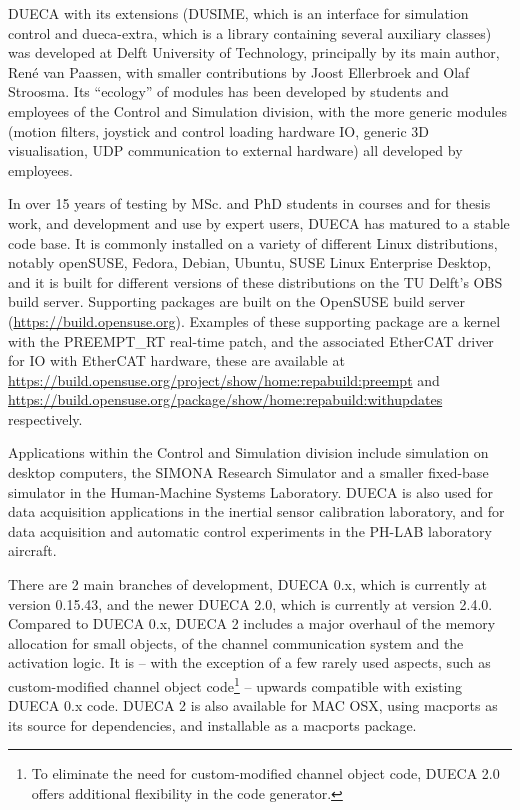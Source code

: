 \documentclass[11pt,a4paper,twoside]{scrreprt}
\begin{document}
DUECA with its extensions (DUSIME, which is an interface for simulation control and dueca-extra, which is a library containing several auxiliary classes) was developed at Delft University of Technology, principally by its main author, René van Paassen, with smaller contributions by Joost Ellerbroek and Olaf Stroosma. Its ``ecology'' of modules has been developed by students and employees of the Control and Simulation division, with the more generic modules (motion filters, joystick and control loading hardware IO, generic 3D visualisation, UDP communication to external hardware) all developed by employees.

In over 15 years of testing by MSc. and PhD students in courses and for thesis work, and development and use by expert users, DUECA has matured to a stable code base. It is commonly installed on a variety of different Linux distributions, notably openSUSE, Fedora, Debian, Ubuntu, SUSE Linux Enterprise Desktop, and it is built for different versions of these distributions on the TU Delft's OBS build server. Supporting packages are built on the OpenSUSE build server (\url{https://build.opensuse.org}). Examples of these supporting package are a kernel with the PREEMPT\_RT real-time patch, and the associated EtherCAT driver for IO with EtherCAT hardware, these are available at \url{https://build.opensuse.org/project/show/home:repabuild:preempt} and \url{https://build.opensuse.org/package/show/home:repabuild:withupdates} respectively.

Applications within the Control and Simulation division include simulation on desktop computers, the SIMONA Research Simulator and a smaller fixed-base simulator in the Human-Machine Systems Laboratory. DUECA is also used for data acquisition applications in the inertial sensor calibration laboratory, and for data acquisition and automatic control experiments in the PH-LAB laboratory aircraft.

There are 2 main branches of development, DUECA 0.x, which is currently at version 0.15.43, and the newer DUECA 2.0, which is currently at version 2.4.0. Compared to DUECA 0.x, DUECA 2 includes a major overhaul of the memory allocation for small objects, of the channel communication system and the activation logic. It is -- with the exception of a few rarely used aspects, such as custom-modified channel object code\footnote{To eliminate the need for custom-modified channel object code, DUECA 2.0 offers additional flexibility in the code generator.} -- upwards compatible with existing DUECA 0.x code. DUECA 2 is also available for MAC OSX, using macports as its source for dependencies, and installable as a macports package.
\end{document}
